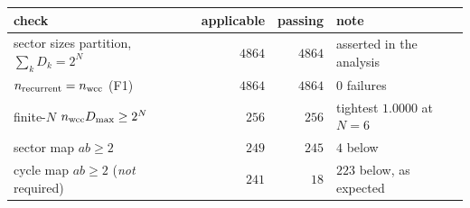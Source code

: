 \begin{tabular}{lrrl}
\hline
check & applicable & passing & note \\
\hline
sector sizes partition, $\sum_k D_k = 2^N$ & $4864$ & $4864$ & asserted in the analysis \\
$n_{\rm recurrent} = n_{\rm wcc}$ (F1) & $4864$ & $4864$ & $0$ failures \\
finite-$N$ $n_{\rm wcc}D_{\max}\geq2^N$ & $256$ & $256$ & tightest $1.0000$ at $N=6$ \\
sector map $ab\geq2$ & $249$ & $245$ & $4$ below \\
cycle map $ab\geq2$ (\emph{not} required) & $241$ & $18$ & $223$ below, as expected \\
\hline
\end{tabular}
